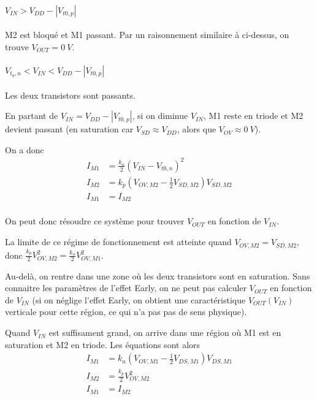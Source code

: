 \documentclass[frenchb,DIV=14]{scrartcl}
\begin{document}
\paragraph{$V_{IN} > V_{DD} - \left|V_{t0,p}\right|$}
M2 est bloqué et M1 passant. Par un raisonnement similaire à ci-dessus,
on trouve $V_{OUT} = \SI{0}{V}$.

\paragraph{$V_{t_0,n} < V_{IN} < V_{DD} - \left|V_{t0,p}\right|$}
Les deux transistors sont passants.

En partant de $V_{IN} = V_{DD} - \left|V_{t0,p}\right|$,
si on diminue $V_{IN}$, M1 reste en triode et M2 devient passant
(en saturation car $V_{SD} \approx V_{DD}$, alors que $V_{OV} \approx \SI{0}{V}$).

On a donc
\begin{align*}
    I_{M1} &= \frac{k_n}{2} (V_{IN} - V_{t0,n})^2 \\
    I_{M2} &= k_p \left(V_{OV,M2}-\frac{1}{2}V_{SD,M2}\right)V_{SD,M2} \\
    I_{M1} &= I_{M2} \\
\end{align*}

On peut donc résoudre ce système pour trouver $V_{OUT}$ en fonction
de $V_{IN}$.

La limite de ce régime de fonctionnement est atteinte quand
$V_{OV,M2} = V_{SD,M2}$, donc $\frac{k_p}{2}V_{OV,M2}^2 = \frac{k_n}{2}V_{OV,M1}^2$.

Au-delà, on rentre dans une zone où les deux transistors sont en saturation.
Sans connaitre les paramètres de l'effet Early, on ne peut pas calculer
$V_{OUT}$ en fonction de $V_{IN}$ (si on néglige l'effet Early, on
obtient une caractéristique $V_{OUT}(V_{IN})$ verticale pour cette région,
ce qui n'a pas pas de sens physique).

Quand $V_{IN}$ est suffisament grand, on arrive dans une région où
M1 est en saturation et M2 en triode.
Les équations sont alors
\begin{align*}
    I_{M1} &= k_n \left(V_{OV,M1}-\frac{1}{2}V_{DS,M1}\right)V_{DS,M1} \\
    I_{M2} &= \frac{k_p}{2} V_{OV,M2}^2 \\
    I_{M1} &= I_{M2} \\
\end{align*}

\end{document}
